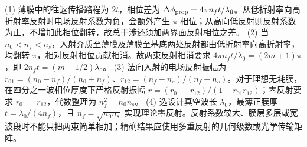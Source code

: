 (1) 薄膜中的往返传播路程为 \(2t\)，相位差为 \(\Delta\phi_{\rm prop}=4\pi n_ft/\lambda_0\)。从低折射率向高折射率反射时电场反射系数为负，会额外产生 \(\pi\) 相位；从高向低反射则反射系数为正，不增加此相位翻转，故总干涉还须加两界面反射相位之差。
(2) 当 \(n_0<n_f<n_s\)，入射介质至薄膜及薄膜至基底两处反射都由低折射率向高折射率，均翻转 \(\pi\)，相对反射相位贡献相消。故两束反射相消要求 \(4\pi n_ft/\lambda_0=(2m+1)\pi\)，即 \(2n_ft=(m+1/2)\lambda_0\)。
(3) 法向入射的电场反射振幅为 \(r_{01}=(n_0-n_f)/(n_0+n_f)\)、\(r_{12}=(n_f-n_s)/(n_f+n_s)\)。对于理想无耗膜，在四分之一波相位厚度下严格反射振幅 \(r=(r_{01}-r_{12})/(1-r_{01}r_{12})\)；零反射要求 \(r_{01}=r_{12}\)，代数整理为 \(n_f^2=n_0n_s\)。
(4) 选设计真空波长 \(\lambda_0\)，最薄正膜厚 \(t=\lambda_0/(4n_f)\)，且 \(n_f=\sqrt{n_0n_s}\) 实现理论零反射。反射系数较大、膜层多层或宽波段时不能只把两束简单相加；精确结果应使用多重反射的几何级数或光学传输矩阵。
